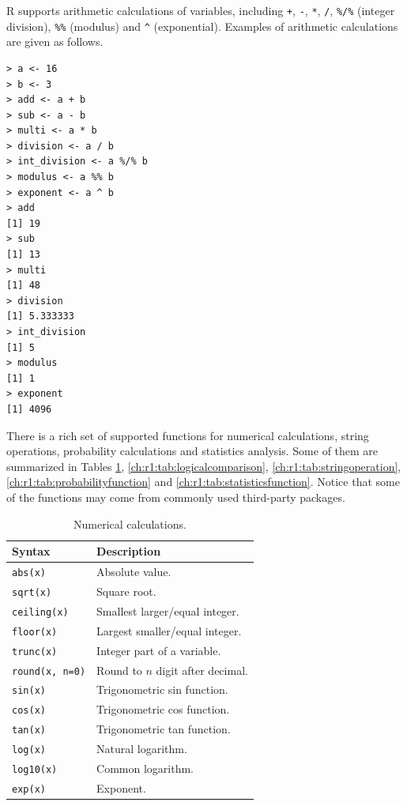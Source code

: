 R supports arithmetic calculations of variables, including \verb|+|, \verb|-|, \verb|*|, \verb|/|, \verb|%/%| (integer division), \verb|%%| (modulus) and \verb|^| (exponential). Examples of arithmetic calculations are given as follows.
\begin{lstlisting}
> a <- 16
> b <- 3
> add <- a + b
> sub <- a - b
> multi <- a * b
> division <- a / b
> int_division <- a %/% b
> modulus <- a %% b
> exponent <- a ^ b
> add
[1] 19
> sub
[1] 13
> multi
[1] 48
> division
[1] 5.333333
> int_division
[1] 5
> modulus
[1] 1
> exponent
[1] 4096
\end{lstlisting}

There is a rich set of supported functions for numerical calculations, string operations, probability calculations and statistics analysis. Some of them are summarized in Tables \ref{ch:r1:tab:numericalcalculation}, \ref{ch:r1:tab:logicalcomparison}, \ref{ch:r1:tab:stringoperation}, \ref{ch:r1:tab:probabilityfunction} and \ref{ch:r1:tab:statisticsfunction}. Notice that some of the functions may come from commonly used third-party packages.

\begin{table}[!htb]
  \centering \caption{Numerical calculations.}\label{ch:r1:tab:numericalcalculation}
  \begin{tabularx}{\textwidth}{lX}
    \hline
    Syntax & Description \\ \hline
    \verb|abs(x)| & Absolute value. \\
    \verb|sqrt(x)| & Square root. \\
    \verb|ceiling(x)| & Smallest larger/equal integer. \\
    \verb|floor(x)| & Largest smaller/equal integer. \\
    \verb|trunc(x)| & Integer part of a variable. \\
    \verb|round(x, n=0)| & Round to $n$ digit after decimal. \\
    \verb|sin(x)| & Trigonometric sin function. \\
    \verb|cos(x)| & Trigonometric cos function. \\
    \verb|tan(x)| & Trigonometric tan function. \\
    \verb|log(x)| & Natural logarithm. \\
    \verb|log10(x)| & Common logarithm. \\
    \verb|exp(x)| & Exponent. \\
    \hline
  \end{tabularx}
\end{table}

